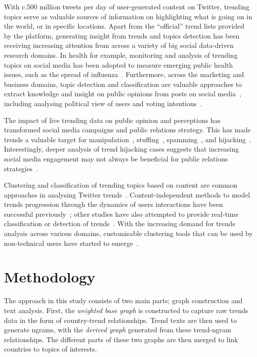 \documentclass{comjnl}
\begin{document}
With c.500 million tweets per day of user-generated content on Twitter, trending topics serve as valuable sources of information on highlighting what is going on in the world, or in specific locations. Apart from the ``official'' trend lists provided by the platform, generating insight from trends and topics detection has been receiving increasing attention from across a variety of big social data-driven research domains. In health for example, monitoring and analysis of trending topics on social media has been adopted to measure emerging public health issues, such as the spread of influenza~\cite{Achrekar2011,Parker2015}. Furthermore, across the marketing and business domains, topic detection and classification are valuable approaches to extract knowledge and insight on public opinions from posts on social media~\cite{blamey-et-al-2012,blamey-et-al-2013,Bello2013,mostafa-et-al-ai2016,albishry-et-al:ssei2018}, including analysing political view of users and voting intentions~\cite{oatley+crick:2014,Fang2015}.

The impact of live trending data on public opinion and perceptions has transformed social media campaigns and public relations strategy. This has made trends a valuable target for manipulation~\cite{Zhang2017}, stuffing~\cite{Irani2010}, spamming~\cite{Sedhai2015,Chu2012}, and hijacking~\cite{VanDam2016}. Interestingly, deeper analysis of trend hijacking cases suggests that increasing social media engagement may not always be beneficial for public relations strategies~\cite{Sanderson2016,albishry-et-al:ssei2018}.

Clustering and classification of trending topics based on content are common approaches in analysing Twitter trends~\cite{Zubiaga2011,Benhardus2013,Ferragina2015,albishry-et-al:iccci2017}. Content-independent methods to model trends progression through the dynamics of users interactions have been successful previously~\cite{TenThij2016}; other studies have also attempted to provide real-time classification or detection of trends~\cite{Mathioudakis2010,Zubiaga2015}. With the increasing demand for trends analysis across various domains, customisable clustering tools that can be used by non-technical users have started to emerge~\cite{Arn2018}.

\section{Methodology}\label{method}

The approach in this study consists of two main parts; graph construction and text analysis. First, the {\emph{weighted base graph}} is constructed to capture raw trends data in the form of country-trend relationships. Trend texts are then used to generate ngrams, with the {\emph{derived graph}} generated from these trend-ngram relationships. The different parts of these two graphs are then merged to link countries to topics of interests.
\end{document}

